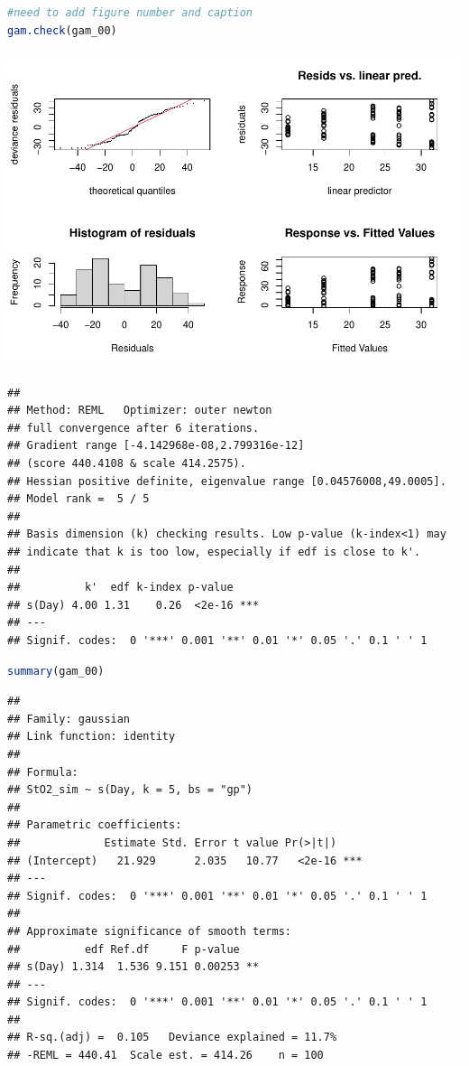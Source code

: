 \documentclass[
]{article}
\begin{document}
\begin{lstlisting}[language=R]
#need to add figure number and caption
gam.check(gam_00)
\end{lstlisting}

\includegraphics{Full_document_files/figure-latex/first-GAM-check-1}

\begin{lstlisting}
## 
## Method: REML   Optimizer: outer newton
## full convergence after 6 iterations.
## Gradient range [-4.142968e-08,2.799316e-12]
## (score 440.4108 & scale 414.2575).
## Hessian positive definite, eigenvalue range [0.04576008,49.0005].
## Model rank =  5 / 5 
## 
## Basis dimension (k) checking results. Low p-value (k-index<1) may
## indicate that k is too low, especially if edf is close to k'.
## 
##          k'  edf k-index p-value    
## s(Day) 4.00 1.31    0.26  <2e-16 ***
## ---
## Signif. codes:  0 '***' 0.001 '**' 0.01 '*' 0.05 '.' 0.1 ' ' 1
\end{lstlisting}

\begin{lstlisting}[language=R]
summary(gam_00)
\end{lstlisting}

\begin{lstlisting}
## 
## Family: gaussian 
## Link function: identity 
## 
## Formula:
## StO2_sim ~ s(Day, k = 5, bs = "gp")
## 
## Parametric coefficients:
##             Estimate Std. Error t value Pr(>|t|)    
## (Intercept)   21.929      2.035   10.77   <2e-16 ***
## ---
## Signif. codes:  0 '***' 0.001 '**' 0.01 '*' 0.05 '.' 0.1 ' ' 1
## 
## Approximate significance of smooth terms:
##          edf Ref.df     F p-value   
## s(Day) 1.314  1.536 9.151 0.00253 **
## ---
## Signif. codes:  0 '***' 0.001 '**' 0.01 '*' 0.05 '.' 0.1 ' ' 1
## 
## R-sq.(adj) =  0.105   Deviance explained = 11.7%
## -REML = 440.41  Scale est. = 414.26    n = 100
\end{lstlisting}
\end{document}
